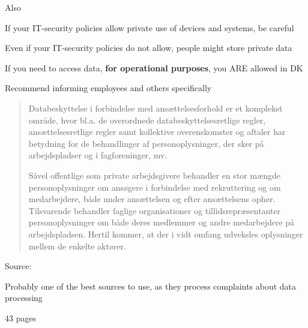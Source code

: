 \documentclass[Screen16to9,17pt]{foils}
\begin{document}
\begin{list2}
  \item Also {\footnotesize{}}
\item If your IT-security policies allow private use of devices and systems, be careful
\item Even if your IT-security policies do not allow, people might store private data
\item If you need to access data, {\bf for operational purposes}, you ARE allowed in DK
\item Recommend informing employees and others specifically
\end{list2}



\begin{quote}
Databeskyttelse i forbindelse med ansættelsesforhold er et komplekst område, hvor bl.a. de overordnede databeskyttelsesretlige regler, ansættelsesretlige regler samt kollektive overenskomster og aftaler har betydning for de behandlinger af personoplysninger, der sker på arbejdspladser og i fagforeninger, mv.

Såvel offentlige som private arbejdsgivere behandler en stor mængde personoplysninger om ansøgere i forbindelse med rekruttering og om medarbejdere, både under ansættelsen og efter ansættelsens ophør. Tilsvarende behandler faglige organisationer og tillidsrepræsentanter personoplysninger om både deres medlemmer og andre medarbejdere på arbejdspladsen. Hertil kommer, at der i vidt omfang udveksles oplysninger mellem de enkelte aktører.
\end{quote}
Source: {\footnotesize{}}

\begin{list2}
\item Probably one of the best sources to use, as they process complaints about data processing
\item 43 pages
\end{list2}


\slidenext{}
\end{document}
